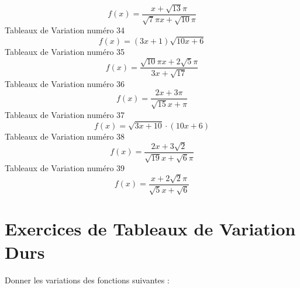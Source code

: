 \documentclass{article}
\begin{document}
\[f(x) = \frac{x + \sqrt{13} \pi}{\sqrt{7} \pi x + \sqrt{10} \pi}\]Tableaux de Variation num\'ero 34 \[f(x) = \left(3 x + 1\right) \sqrt{10 x + 6}\]Tableaux de Variation num\'ero 35 \[f(x) = \frac{\sqrt{10} \pi x + 2 \sqrt{5} \pi}{3 x + \sqrt{17}}\]Tableaux de Variation num\'ero 36 \[f(x) = \frac{2 x + 3 \pi}{\sqrt{15} x + \pi}\]Tableaux de Variation num\'ero 37 \[f(x) = \sqrt{3 x + 10} \cdot \left(10 x + 6\right)\]Tableaux de Variation num\'ero 38 \[f(x) = \frac{2 x + 3 \sqrt{2}}{\sqrt{19} x + \sqrt{6} \pi}\]Tableaux de Variation num\'ero 39 \[f(x) = \frac{x + 2 \sqrt{2} \pi}{\sqrt{5} x + \sqrt{6}}\]
 \section{Exercices de Tableaux de Variation Durs}

 Donner les variations des fonctions suivantes : 
\end{document}
